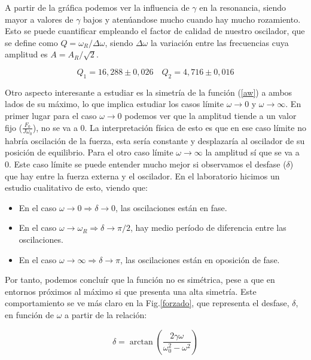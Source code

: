 \documentclass[a4paper,12pt,titlepage]{article}
\begin{document}
A partir de la gráfica podemos ver la influencia de $\gamma$ en la resonancia, siendo mayor a valores de $\gamma$ bajos y atenúandose mucho cuando hay mucho rozamiento. Esto se puede cuantificar empleando el factor de calidad de nuestro oscilador, que se define como $Q=\omega_R/\Delta \omega$, siendo $\Delta \omega$ la variación entre las frecuencias cuya amplitud es $A=A_R/\sqrt{2}$.

\begin{equation}
    Q_1 = 16,288 \pm 0,026 \quad Q_2= 4,716 \pm 0,016
\end{equation}

Otro aspecto interesante a estudiar es la simetría de la función (\ref{aw}) a ambos lados de su máximo, lo que implica estudiar los casos límite $\omega \to 0$ y $\omega \to \infty$. En primer lugar para el caso $\omega \to 0$ podemos ver que la amplitud tiende a un valor fijo ($\frac{F_0}{J\omega_0}$), no se va a $0$. La interpretación física de esto es que en ese caso límite no habría oscilación de la fuerza, esta sería constante y desplazaría al oscilador de su posición de equilibrio. Para el otro caso límite $\omega \to \infty$ la amplitud sí que se va a $0$. Este caso límite se puede entender mucho mejor si observamos el desfase ($\delta$) que hay entre la fuerza externa y el oscilador. En el laboratorio hicimos un estudio cualitativo de esto, viendo que:

\newpage

\begin{itemize}
    \item En el caso $\omega \to 0 \Rightarrow \delta \to 0$, las oscilaciones están en fase.
    \item En el caso $\omega \to \omega_R \Rightarrow \delta \to \pi/2$, hay medio período de diferencia entre las oscilaciones.
    \item En el caso $\omega \to \infty \Rightarrow \delta \to \pi$, las oscilaciones están en oposición de fase.
\end{itemize}

Por tanto, podemos concluír que la función no es simétrica, pese a que en entornos próximos al máximo si que presenta una alta simetría. Este comportamiento se ve más claro en la Fig.\ref{forzado}, que representa el desfase, $\delta$, en función de $\omega$ a partir de la relación:

\begin{equation}
    \delta = \arctan\left(\frac{2\gamma \omega}{\omega_0^2-\omega^2}\right)
\end{equation}
\end{document}

